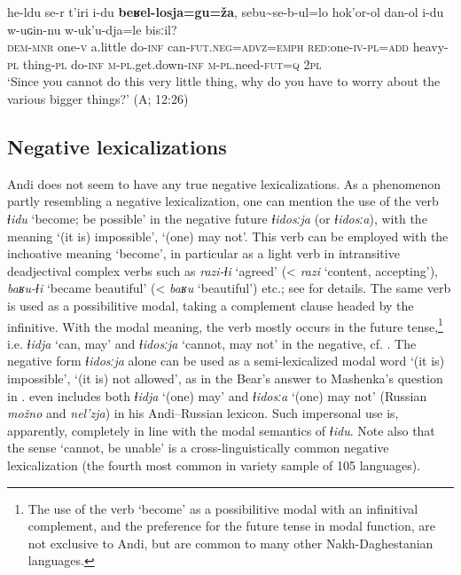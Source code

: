 \documentclass[output=paper,colorlinks=true, citecolor=brown]{langscibook}
\begin{document}
\newpage
\ea
    \label{ex:and:37}
    \gll {\ob}he{}-ldu se{}-r t’iri i{}-du \textbf{beʁel-losja=gu=ža}{\cb}, sebu{\textasciitilde}se{}-b{}-ul=lo hok’or{}-ol dan{}-ol i{}-du w{}-uɢin{}-nu w{}-uk’u{}-dja=le bisːil? \\
    {\db}\textsc{dem-mnr} one-\textsc{v} a.little do-\textsc{inf} can-\textsc{fut.neg=advz=emph} \textsc{red}:one-\textsc{iv-pl=add}
     heavy-\textsc{pl} thing-\textsc{pl} do-\textsc{inf} \textsc{m}{}-\textsc{pl}.get.down{}-\textsc{inf} \textsc{m}{}-\textsc{pl}.need{}-\textsc{fut=q} \textsc{2pl} \\
    \glt ‘Since you cannot do this very little thing, why do you have to worry about the various bigger things?’ (A;  12:26)
\z 

\subsection{Negative lexicalizations} \label{sec:and:2.5} 

Andi does not seem to have any true negative lexicalizations. As a phenomenon partly resembling a negative lexicalization, one can mention the use of the verb \textit{ɬidu} ‘become; be possible’ in the negative future \textit{ɬidosːja} (or \textit{ɬidosːa}), with the meaning ‘(it is) impossible’, ‘(one) may not’. This verb can be employed with the inchoative meaning ‘become’, in particular as a light verb in intransitive deadjectival complex verbs such as \textit{razi{}-ɬi} ‘agreed’ (< \textit{razi} ‘content, accepting’), \textit{baʁu{}-ɬi} ‘became beautiful’ (< \textit{baʁu} ‘beautiful’) etc.; see \citet[116--125]{Rochant2018} for details. The same verb is used as a possibilitive modal, taking a complement clause headed by the infinitive. 
With the modal meaning, the verb mostly occurs in the future tense,\footnote{The use of the verb ‘become’ as a possibilitive modal with an infinitival complement, and the preference for the future tense in modal function, are not exclusive to Andi, but are common to many other Nakh-Daghestanian languages.} i.e. \textit{ɬidja} ‘can, may’ and \textit{ɬidosːja} ‘cannot, may not’ in the negative, cf. . The negative form \textit{ɬidosːja} alone can be used as a semi-lexicalized modal word ‘(it is) impossible’, ‘(it is) not allowed’, as in the Bear’s answer to Mashenka’s question in . \citet{Salimov2010} even includes both \textit{ɬidja} ‘(one) may’ and \textit{ɬidosːa} ‘(one) may not’ (Russian \textit{možno} and \textit{nel’zja}) in his Andi–Russian lexicon. Such impersonal use is, apparently, completely in line with the modal semantics of \textit{ɬidu}. Note also that the sense ‘cannot, be unable’ is a cross-linguistically common negative lexicalization (the fourth most common in  variety sample of 105 languages).
\end{document}
